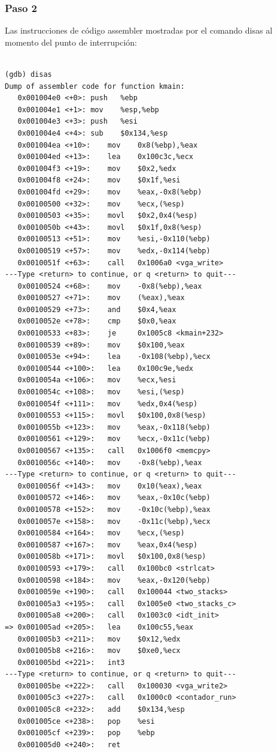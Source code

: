 \documentclass[a4paper]{article}
\begin{document}
\subsubsection*{Paso 2} 
\begin{list}{•}
\item Las instrucciones de código assembler mostradas por el comando disas al momento del punto de interrupción:

\begin{lstlisting}

(gdb) disas
Dump of assembler code for function kmain:
   0x001004e0 <+0>:	push   %ebp
   0x001004e1 <+1>:	mov    %esp,%ebp
   0x001004e3 <+3>:	push   %esi
   0x001004e4 <+4>:	sub    $0x134,%esp
   0x001004ea <+10>:	mov    0x8(%ebp),%eax
   0x001004ed <+13>:	lea    0x100c3c,%ecx
   0x001004f3 <+19>:	mov    $0x2,%edx
   0x001004f8 <+24>:	mov    $0x1f,%esi
   0x001004fd <+29>:	mov    %eax,-0x8(%ebp)
   0x00100500 <+32>:	mov    %ecx,(%esp)
   0x00100503 <+35>:	movl   $0x2,0x4(%esp)
   0x0010050b <+43>:	movl   $0x1f,0x8(%esp)
   0x00100513 <+51>:	mov    %esi,-0x110(%ebp)
   0x00100519 <+57>:	mov    %edx,-0x114(%ebp)
   0x0010051f <+63>:	call   0x1006a0 <vga_write>
---Type <return> to continue, or q <return> to quit---
   0x00100524 <+68>:	mov    -0x8(%ebp),%eax
   0x00100527 <+71>:	mov    (%eax),%eax
   0x00100529 <+73>:	and    $0x4,%eax
   0x0010052e <+78>:	cmp    $0x0,%eax
   0x00100533 <+83>:	je     0x1005c8 <kmain+232>
   0x00100539 <+89>:	mov    $0x100,%eax
   0x0010053e <+94>:	lea    -0x108(%ebp),%ecx
   0x00100544 <+100>:	lea    0x100c9e,%edx
   0x0010054a <+106>:	mov    %ecx,%esi
   0x0010054c <+108>:	mov    %esi,(%esp)
   0x0010054f <+111>:	mov    %edx,0x4(%esp)
   0x00100553 <+115>:	movl   $0x100,0x8(%esp)
   0x0010055b <+123>:	mov    %eax,-0x118(%ebp)
   0x00100561 <+129>:	mov    %ecx,-0x11c(%ebp)
   0x00100567 <+135>:	call   0x1006f0 <memcpy>
   0x0010056c <+140>:	mov    -0x8(%ebp),%eax
---Type <return> to continue, or q <return> to quit---
   0x0010056f <+143>:	mov    0x10(%eax),%eax
   0x00100572 <+146>:	mov    %eax,-0x10c(%ebp)
   0x00100578 <+152>:	mov    -0x10c(%ebp),%eax
   0x0010057e <+158>:	mov    -0x11c(%ebp),%ecx
   0x00100584 <+164>:	mov    %ecx,(%esp)
   0x00100587 <+167>:	mov    %eax,0x4(%esp)
   0x0010058b <+171>:	movl   $0x100,0x8(%esp)
   0x00100593 <+179>:	call   0x100bc0 <strlcat>
   0x00100598 <+184>:	mov    %eax,-0x120(%ebp)
   0x0010059e <+190>:	call   0x100044 <two_stacks>
   0x001005a3 <+195>:	call   0x1005e0 <two_stacks_c>
   0x001005a8 <+200>:	call   0x1003c0 <idt_init>
=> 0x001005ad <+205>:	lea    0x100c55,%eax
   0x001005b3 <+211>:	mov    $0x12,%edx
   0x001005b8 <+216>:	mov    $0xe0,%ecx
   0x001005bd <+221>:	int3   
---Type <return> to continue, or q <return> to quit---
   0x001005be <+222>:	call   0x100030 <vga_write2>
   0x001005c3 <+227>:	call   0x1000c0 <contador_run>
   0x001005c8 <+232>:	add    $0x134,%esp
   0x001005ce <+238>:	pop    %esi
   0x001005cf <+239>:	pop    %ebp
   0x001005d0 <+240>:	ret   


\end{lstlisting}
\end{list}
\end{document}
